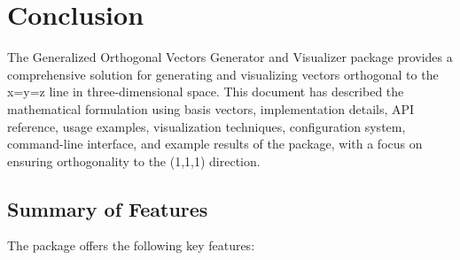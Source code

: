 \newpage
\section{Conclusion}

The Generalized Orthogonal Vectors Generator and Visualizer package provides a comprehensive solution for generating and visualizing vectors orthogonal to the x=y=z line in three-dimensional space. This document has described the mathematical formulation using basis vectors, implementation details, API reference, usage examples, visualization techniques, configuration system, command-line interface, and example results of the package, with a focus on ensuring orthogonality to the (1,1,1) direction.

\subsection{Summary of Features}

The package offers the following key features:


